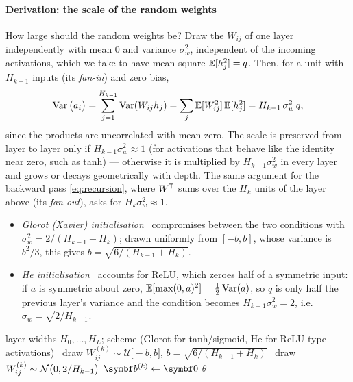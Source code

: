 \documentclass[11pt]{article}
\newcommand{\bv}{\vect{b}}
\begin{document}
\paragraph{Derivation: the scale of the random weights} How large should the random weights be? Draw the $W_{ij}$ of
one layer independently with mean $0$ and variance $\sigma_w^2$, independent of the incoming activations, which we
take to have mean square $\mathbb{E}[h_j^2] = q$. Then, for a unit with $H_{k-1}$ inputs (its \emph{fan-in}) and zero bias,
\[
  \operatorname{Var}\big(a_i\big) = \sum_{j=1}^{H_{k-1}} \operatorname{Var}(W_{ij}h_j) = \sum_j \mathbb{E}[W_{ij}^2]\,\mathbb{E}[h_j^2] = H_{k-1}\,\sigma_w^2\,q ,
\]
since the products are uncorrelated with mean zero. The scale is preserved from layer to layer only if
$H_{k-1}\sigma_w^2 \approx 1$ (for activations that behave like the identity near zero, such as tanh) --- otherwise it
is multiplied by $H_{k-1}\sigma_w^2$ in every layer and grows or decays geometrically with depth. The same argument for
the backward pass \eqref{eq:recursion}, where $W^{\mathsf{T}}$ sums over the $H_k$ units of the layer above (its \emph{fan-out}),
asks for $H_k\sigma_w^2 \approx 1$.
\begin{itemize}
\item \emph{Glorot (Xavier) initialisation}~\cite{glorot2010} compromises between the two conditions with
  $\sigma_w^2 = 2/(H_{k-1} + H_k)$; drawn uniformly from $[-b, b]$, whose variance is $b^2/3$, this gives
  $b = \sqrt{6/(H_{k-1} + H_k)}$.
\item \emph{He initialisation}~\cite{he2015} accounts for ReLU, which zeroes half of a symmetric input: if $a$ is
  symmetric about zero, $\mathbb{E}[\max(0, a)^2] = \frac12\operatorname{Var}(a)$, so $q$ is only half the previous layer's variance and the
  condition becomes $H_{k-1}\sigma_w^2 = 2$, i.e.\ $\sigma_w = \sqrt{2/H_{k-1}}$.
\end{itemize}

\begin{algorithm}[H]
\caption{Random initialisation of a fully connected network}\label{alg:init}
\begin{algorithmic}[1]
\Require layer widths $H_0, \dots, H_L$; scheme (Glorot for tanh/sigmoid, He for ReLU-type activations)
     \ draw $W^{(k)}_{ij} \sim \mathcal{U}\big[-b, b\big]$, $b = \sqrt{6/(H_{k-1} + H_k)}$
    \Else \ draw $W^{(k)}_{ij} \sim \mathcal{N}\big(0, 2/H_{k-1}\big)$ 
    \EndIf
    \State $\bv^{(k)} \gets \vect{0}$
  \EndFor
  \State \Return $\theta$
\EndFunction
\end{algorithmic}
\end{algorithm}
\end{document}

